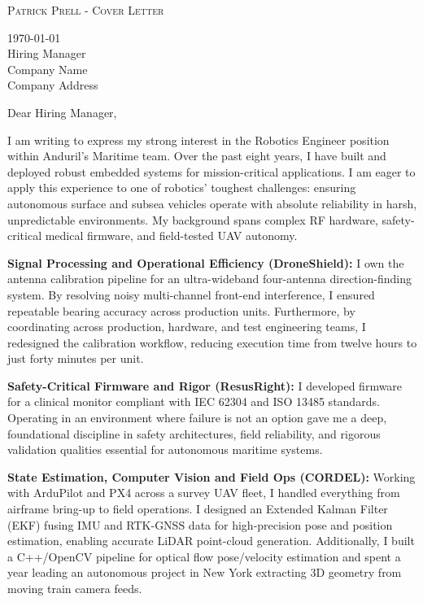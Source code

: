 \documentclass[localFont,alternative]{documentMETADATA}
\begin{document}
	\makecvheader

	\makecvfooter
		{\textsc{}}
		{\textsc{Patrick Prell - Cover Letter}}
		{\thepage}

	\setlength{\parskip}{0.6em}
	\vspace{1.5em}

	\begin{flushleft}
		\today\\[0.8em]
		Hiring Manager\\
		Company Name\\
		Company Address
	\end{flushleft}

	\vspace{1em}

	Dear Hiring Manager,

	I am writing to express my strong interest in the Robotics Engineer position within Anduril's Maritime team. Over
	the past eight years, I have built and deployed robust embedded systems for mission-critical applications. I am
	eager to apply this experience to one of robotics' toughest challenges: ensuring autonomous surface and subsea
	vehicles operate with absolute reliability in harsh, unpredictable environments.
	My background spans complex RF hardware, safety-critical medical firmware, and field-tested UAV autonomy.

	\textbf{Signal Processing and Operational Efficiency (DroneShield):} I own the antenna calibration pipeline for an
	ultra-wideband four-antenna direction-finding system. By resolving noisy multi-channel front-end interference, I
	ensured repeatable bearing accuracy across production units. Furthermore, by coordinating across production,
	hardware, and test engineering teams, I redesigned the calibration workflow, reducing execution time from twelve
	hours to just forty minutes per unit.

	\textbf{Safety-Critical Firmware and Rigor (ResusRight):} I developed firmware for a clinical monitor compliant with
	IEC 62304 and ISO 13485 standards. Operating in an environment where failure is not an option gave me a deep,
	foundational discipline in safety architectures, field reliability, and rigorous validation qualities essential
	for autonomous maritime systems.

	\textbf{State Estimation, Computer Vision and Field Ops (CORDEL):} Working with ArduPilot and PX4 across a survey UAV
	fleet, I handled everything from airframe bring-up to field operations. I designed an Extended Kalman
	Filter (EKF) fusing IMU and RTK-GNSS data for high-precision pose and position estimation, enabling accurate
	LiDAR point-cloud generation. Additionally, I built a C++/OpenCV pipeline for optical flow pose/velocity
	estimation and spent a year leading an autonomous project in New York extracting 3D geometry from moving train
	camera feeds.
\end{document}
